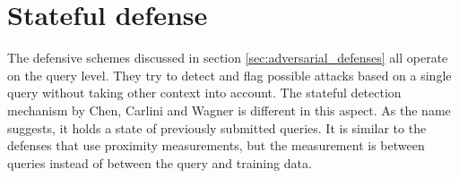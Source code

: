 %


\section{Stateful defense}\label{sec:stateful_detection}
The defensive schemes discussed in section \ref{sec:adversarial_defenses} all operate on the query level. They try to detect and flag possible attacks based on a single query without taking other context into account. The stateful detection mechanism by Chen, Carlini and Wagner \cite{chen_stateful_2019} is different in this aspect. As the name suggests, it holds a state of previously submitted queries. It is similar to the defenses that use proximity measurements, but the measurement is between queries instead of between the query and training data.\\

